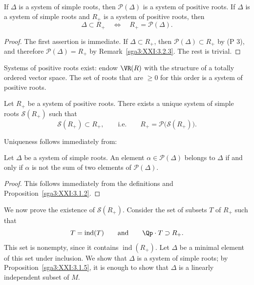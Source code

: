 \begin{proposition}\label{sga3:XXI:3.2.6}
If \(\Delta\) is a system of simple roots, then
\(\mathscr{P}(\Delta)\) is a system of positive roots. If \(\Delta\)
is a system of simple roots and \(R_+\) is a system of positive roots,
then
\[
 \Delta\subset R_+
 \quad\Longleftrightarrow\quad
 R_+=\mathscr{P}(\Delta).
\]
\end{proposition}

\begin{proof}
The first assertion is immediate. If \(\Delta\subset R_+\), then
\(\mathscr{P}(\Delta)\subset R_+\) by (P 3), and therefore
\(\mathscr{P}(\Delta)=R_+\) by
Remark~\ref{sga3:XXI:3.2.3}. The rest is trivial.
\end{proof}

\begin{remark}\label{sga3:XXI:3.2.7}
Systems of positive roots exist: endow \(\VR(R)\) with the structure
of a totally ordered vector space. The set of roots that are
\(\geq0\) for this order is a system of positive roots.
\end{remark}

\begin{theorem}\label{sga3:XXI:3.2.8}
Let \(R_+\) be a system of positive roots. There exists a unique
system of simple roots \(\mathscr{S}(R_+)\) such that
\[
 \mathscr{S}(R_+)\subset R_+,
 \qquad\text{i.e.}\qquad
 R_+=\mathscr{P}\bigl(\mathscr{S}(R_+)\bigr).
\]
\end{theorem}

Uniqueness follows immediately from:

\begin{lemma}\label{sga3:XXI:3.2.9}
Let \(\Delta\) be a system of simple roots. An element
\(\alpha\in\mathscr{P}(\Delta)\) belongs to \(\Delta\) if and only if
\(\alpha\) is not the sum of two elements of
\(\mathscr{P}(\Delta)\).
\end{lemma}

\begin{proof}
This follows immediately from the definitions and
Proposition~\ref{sga3:XXI:3.1.2}.
\end{proof}

We now prove the existence of \(\mathscr{S}(R_+)\). Consider the set
of subsets \(T\) of \(R_+\) such that
\[
 T=\operatorname{ind}(T)
 \qquad\text{and}\qquad
 \Qp\cdot T\supset R_+.
\]
This set is nonempty, since it contains
\(\operatorname{ind}(R_+)\). Let \(\Delta\) be a minimal element of
this set under inclusion. We show that \(\Delta\) is a system of
simple roots; by Proposition~\ref{sga3:XXI:3.1.5}, it is enough to
show that \(\Delta\) is a linearly independent subset of
\(M\).

